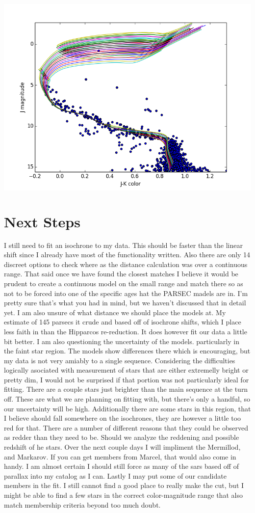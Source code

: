 \documentclass{article}
\begin{document}
\begin{center}
\includegraphics[width=.8\textwidth]{modelfit}
\end{center}

\section{Next Steps}
I still need to fit an isochrone to my data.  This should be faster than the linear shift since I already have most of the functionality written.  Also there are only 14 discreet options to check where as the distance calculation was over a continuous range.  That said once we have found the closest matches I believe it would be prudent to create a continuous model on the small range and match there so as not to be forced into one of the specific ages hat the PARSEC madels are in.  I'm pretty sure that's what you had in mind, but we haven't discussed that in detail yet.  I am also unsure of what distance we should place the models at.  My estimate of 145 parsecs it crude and based off of isochrone shifts, which I place less faith in than the Hipparcos re-reduction.  It does however fit our data a little bit better.  I am also questioning the uncertainty of the models.  particularly in the faint star region.  The models show differences there which is encouraging, but my data is not very amiably to a single sequence.  Considering the difficulties logically asociated with measurement of stars that are either extremelly bright or pretty dim, I would not be surprised if that portion was not particularly ideal for fitting.  There are a couple stars just brighter than the main sequence at the turn off.  These are what we are planning on fitting with, but there's only a handful, so our uncertainty will be high.  Additionally there are some stars in this region, that I believe should fall somewhere on the isochrones, they are however a little too red for that.  There are a number of different reasons that they could be observed as redder than they need to be.  Should we analyze the reddening and possible redshift of he stars.  Over the next couple days I will impliment the Mermillod, and Markarov.  If you can get members from Marcel, that would also come in handy.  I am almost certain I should still force as many of the sars based off of parallax into my catalog as I can.  Lastly I may put some of our candidate members in the fit.  I still cannot find a good place to really make the cut, but I might be able to find a few stars in the correct color-magnitude range that also match membership criteria beyond too much doubt.
\end{document}
